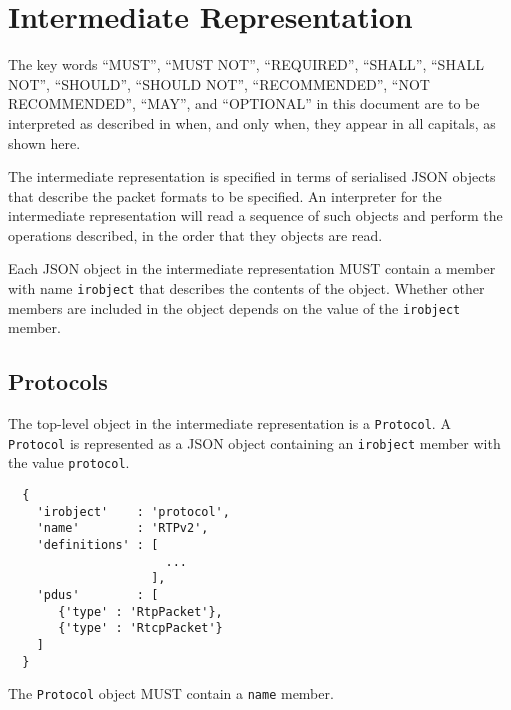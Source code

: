 \documentclass[twocolumn,a4paper]{article}
\begin{document}


\section{Intermediate Representation}

The key words ``MUST'', ``MUST NOT'', ``REQUIRED'', ``SHALL'', ``SHALL
NOT'', ``SHOULD'', ``SHOULD NOT'', ``RECOMMENDED'', ``NOT RECOMMENDED'',
``MAY'', and ``OPTIONAL'' in this document are to be interpreted as
described in \cite{RFC2119,RFC8174} when, and only when, they appear
in all capitals, as shown here.



The intermediate representation is specified in terms of serialised JSON
\cite{RFC7159} objects that describe the packet formats to be specified.
An interpreter for the intermediate representation will read a sequence of
such objects and perform the operations described, in the order that they
objects are read.

Each JSON object in the intermediate representation MUST contain a member
with name \texttt{irobject} that describes the contents of the object.
Whether other members are included in the object depends on the value of
the \texttt{irobject} member.

\subsection{Protocols}

The top-level object in the intermediate representation is a
\texttt{Protocol}. A \texttt{Protocol} is represented as a JSON object
containing an \texttt{irobject} member with the value \texttt{protocol}.

\begin{verbatim}
  {
    'irobject'    : 'protocol',
    'name'        : 'RTPv2',
    'definitions' : [
                      ...
                    ],
    'pdus'        : [
       {'type' : 'RtpPacket'},
       {'type' : 'RtcpPacket'}
    ]
  }
\end{verbatim}

The \texttt{Protocol} object MUST contain a \texttt{name} member.
\end{document}

